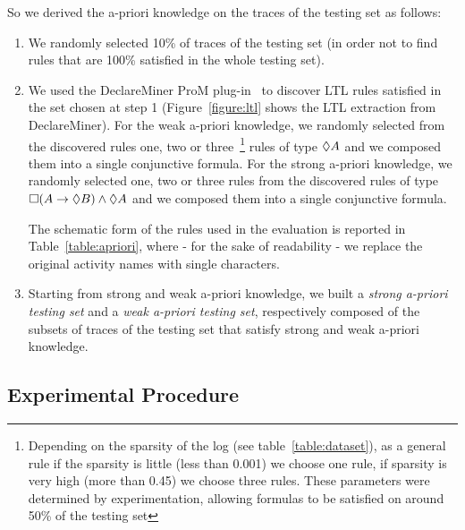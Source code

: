 So we derived the a-priori knowledge on the traces of the testing set as follows:
\begin{enumerate}
\item We randomly selected 10\% of traces of the testing set (in order not to find rules that are 100\% satisfied in the whole testing set). 
\item We used the DeclareMiner ProM plug-in~\cite{Maggi2012} to discover LTL rules satisfied in the set chosen at step 1 (Figure~\ref{figure:ltl} shows the LTL extraction from DeclareMiner). 
\subitem For the weak a-priori knowledge, we randomly selected from the discovered rules one, two or three~\footnote{Depending on the sparsity of the log (see table~\ref{table:dataset}), as a general rule if the sparsity is little (less than 0.001) we choose one rule, if sparsity is very high (more than 0.45) we choose three rules. These parameters were determined by experimentation, allowing formulas to be satisfied on around 50\% of the testing set} rules of type $\lozenge A$ and we composed them into a single conjunctive formula. 
\subitem For the strong a-priori knowledge, we randomly selected one, two or three rules from the discovered rules of type $\square(A \rightarrow \lozenge B) \wedge \lozenge A$ and we composed them into a single conjunctive formula. 

The schematic form of the rules used in the evaluation is reported in Table~\ref{table:apriori}, where - for the sake of readability - we replace the original activity names with single characters. 

\item Starting from strong and weak a-priori knowledge, we built a \emph{strong a-priori testing set} and a \emph{weak a-priori testing set}, respectively composed of the subsets of traces of the testing set that satisfy strong and weak a-priori knowledge.

\end{enumerate}

\subsection{Experimental Procedure}
\label{ssec:procedure}



